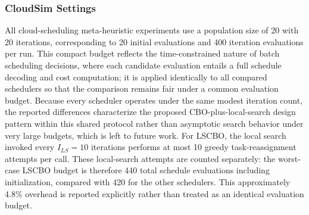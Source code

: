 \documentclass[pdflatex,onecolumn,sn-mathphys-num]{sn-jnl}
\begin{document}
\subsubsection{CloudSim Settings}
All cloud-scheduling meta-heuristic experiments use a population size of 20 with 20 iterations, corresponding to 20 initial evaluations and 400 iteration evaluations per run. This compact budget reflects the time-constrained nature of batch scheduling decisions, where each candidate evaluation entails a full schedule decoding and cost computation; it is applied identically to all compared schedulers so that the comparison remains fair under a common evaluation budget. Because every scheduler operates under the same modest iteration count, the reported differences characterize the proposed CBO-plus-local-search design pattern within this shared protocol rather than asymptotic search behavior under very large budgets, which is left to future work. For LSCBO, the local search invoked every $I_{LS}=10$ iterations performs at most 10 greedy task-reassignment attempts per call. These local-search attempts are counted separately: the worst-case LSCBO budget is therefore 440 total schedule evaluations including initialization, compared with 420 for the other schedulers. This approximately 4.8\% overhead is reported explicitly rather than treated as an identical evaluation budget.
\end{document}

